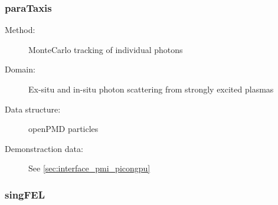 \documentclass[12pt]{scrartcl}
\begin{document}
\subsubsection{paraTaxis\label{sec:interface_scat_parataxis}}
\begin{description}
  \item[Method:] MonteCarlo tracking of individual photons
  \item[Domain:] Ex-situ and in-situ photon scattering from strongly excited
    plasmas
  \item[Data structure:] openPMD particles
  \item[Demonstraction data:] See \ref{sec:interface_pmi_picongpu}
\end{description}

\subsubsection{singFEL\label{sec:interface_diffr_singfel} }
\end{document}
